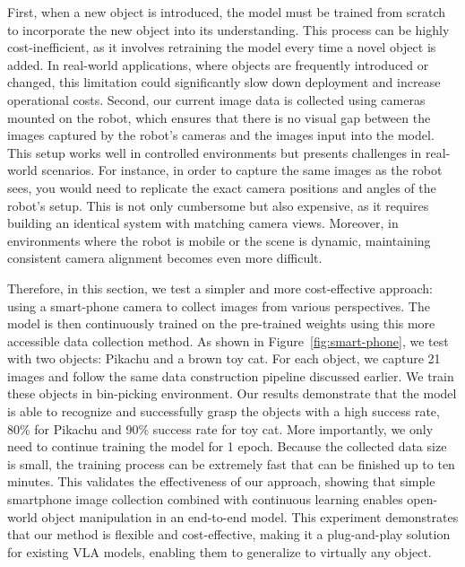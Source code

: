 First, when a new object is introduced, the model must be trained from scratch to incorporate the new object into its understanding. This process can be highly cost-inefficient, as it involves retraining the model every time a novel object is added. In real-world applications, where objects are frequently introduced or changed, this limitation could significantly slow down deployment and increase operational costs. Second, our current image data is collected using cameras mounted on the robot, which ensures that there is no visual gap between the images captured by the robot's cameras and the images input into the model. This setup works well in controlled environments but presents challenges in real-world scenarios. For instance, in order to capture the same images as the robot sees, you would need to replicate the exact camera positions and angles of the robot’s setup. This is not only cumbersome but also expensive, as it requires building an identical system with matching camera views. Moreover, in environments where the robot is mobile or the scene is dynamic, maintaining consistent camera alignment becomes even more difficult.

Therefore, in this section, we test a simpler and more cost-effective approach: using a smart-phone camera to collect images from various perspectives. The model is then continuously trained on the pre-trained weights using this more accessible data collection method. As shown in Figure~\ref{fig:smart-phone}, we test with two objects: Pikachu and a brown toy cat. For each object, we capture 21 images and follow the same data construction pipeline discussed earlier. We train these objects in bin-picking environment. Our results demonstrate that the model is able to recognize and successfully grasp the objects with a high success rate, 80\% for Pikachu and 90\% success rate for toy cat. More importantly, we only need to continue training the model for 1 epoch. Because the collected data size is small, the training process can be extremely fast that can be finished up to ten minutes. This validates the effectiveness of our approach, showing that simple smartphone image collection combined with continuous learning enables open-world object manipulation in an end-to-end model. This experiment demonstrates that our method is flexible and cost-effective, making it a plug-and-play solution for existing VLA models, enabling them to generalize to virtually any object.